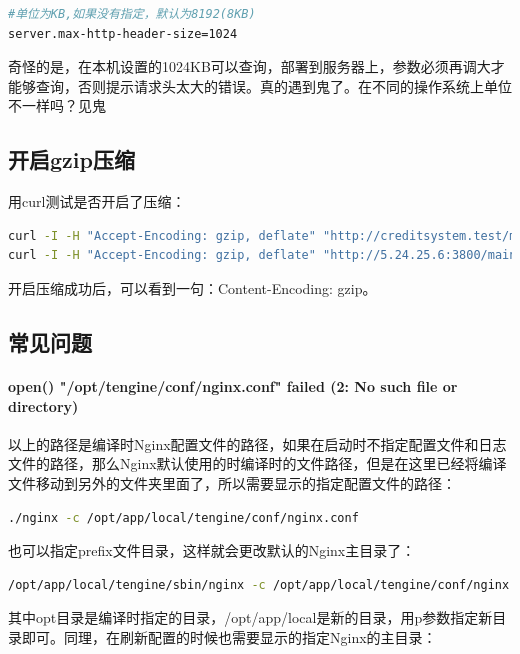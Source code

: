 \documentclass[letter]{book}
\begin{document}
\begin{lstlisting}[language=bash]
#单位为KB,如果没有指定，默认为8192(8KB)
server.max-http-header-size=1024
\end{lstlisting}

奇怪的是，在本机设置的1024KB可以查询，部署到服务器上，参数必须再调大才能够查询，否则提示请求头太大的错误。真的遇到鬼了。在不同的操作系统上单位不一样吗？见鬼

\subsection{开启gzip压缩}

用curl测试是否开启了压缩：

\begin{lstlisting}[language=Bash]
curl -I -H "Accept-Encoding: gzip, deflate" "http://creditsystem.test/main"
curl -I -H "Accept-Encoding: gzip, deflate" "http://5.24.25.6:3800/main"
\end{lstlisting}

开启压缩成功后，可以看到一句：Content-Encoding: gzip。

\subsection{常见问题}

\paragraph{open() "/opt/tengine/conf/nginx.conf" failed (2: No such file or directory)}

以上的路径是编译时Nginx配置文件的路径，如果在启动时不指定配置文件和日志文件的路径，那么Nginx默认使用的时编译时的文件路径，但是在这里已经将编译文件移动到另外的文件夹里面了，所以需要显示的指定配置文件的路径：

\begin{lstlisting}[language=bash]
./nginx -c /opt/app/local/tengine/conf/nginx.conf
\end{lstlisting}

也可以指定prefix文件目录，这样就会更改默认的Nginx主目录了：

\begin{lstlisting}[language=bash]
/opt/app/local/tengine/sbin/nginx -c /opt/app/local/tengine/conf/nginx.conf -p /opt/app/local/tengine
\end{lstlisting}

其中opt目录是编译时指定的目录，/opt/app/local是新的目录，用p参数指定新目录即可。同理，在刷新配置的时候也需要显示的指定Nginx的主目录：
\end{document}
